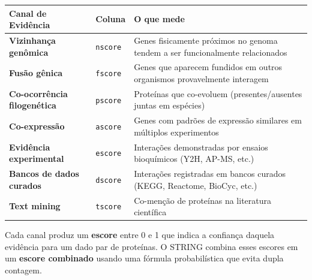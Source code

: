 \documentclass[
  letterpaper,
  DIV=11,
  numbers=noendperiod]{scrreprt}
\begin{document}
\begin{longtable}[]{@{}
  >{\raggedright\arraybackslash}p{}
  >{\raggedright\arraybackslash}p{}
  >{\raggedright\arraybackslash}p{}@{}}
\toprule\noalign{}
\begin{minipage}[b]{\linewidth}\raggedright
Canal de Evidência
\end{minipage} & \begin{minipage}[b]{\linewidth}\raggedright
Coluna
\end{minipage} & \begin{minipage}[b]{\linewidth}\raggedright
O que mede
\end{minipage} \\
\midrule\noalign{}
\endhead
\bottomrule\noalign{}
\endlastfoot
\textbf{Vizinhança genômica} & \texttt{nscore} & Genes fisicamente
próximos no genoma tendem a ser funcionalmente relacionados \\
\textbf{Fusão gênica} & \texttt{fscore} & Genes que aparecem fundidos em
outros organismos provavelmente interagem \\
\textbf{Co-ocorrência filogenética} & \texttt{pscore} & Proteínas que
co-evoluem (presentes/ausentes juntas em espécies) \\
\textbf{Co-expressão} & \texttt{ascore} & Genes com padrões de expressão
similares em múltiplos experimentos \\
\textbf{Evidência experimental} & \texttt{escore} & Interações
demonstradas por ensaios bioquímicos (Y2H, AP-MS, etc.) \\
\textbf{Bancos de dados curados} & \texttt{dscore} & Interações
registradas em bancos curados (KEGG, Reactome, BioCyc, etc.) \\
\textbf{Text mining} & \texttt{tscore} & Co-menção de proteínas na
literatura científica \\
\end{longtable}

Cada canal produz um \textbf{escore} entre 0 e 1 que indica a confiança
daquela evidência para um dado par de proteínas. O STRING combina esses
escores em um \textbf{escore combinado} usando uma fórmula
probabilística que evita dupla contagem.
\end{document}
